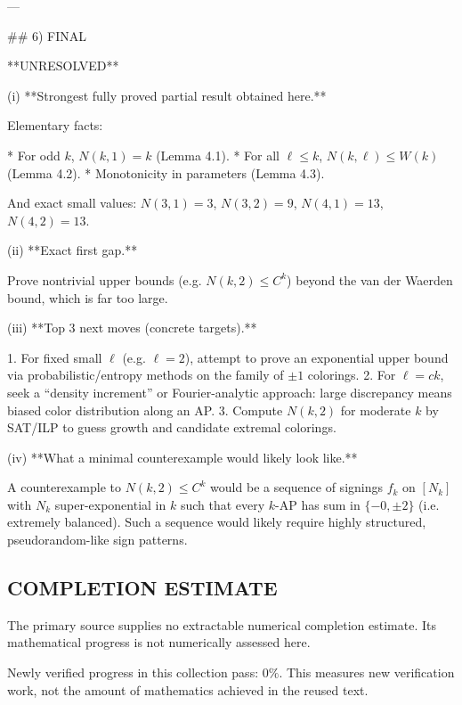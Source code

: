 ---

## 6) FINAL

**UNRESOLVED**

(i) **Strongest fully proved partial result obtained here.**

Elementary facts:

* For odd $k$, $N(k,1)=k$ (Lemma 4.1).
* For all $\ell\le k$, $N(k,\ell)\le W(k)$ (Lemma 4.2).
* Monotonicity in parameters (Lemma 4.3).

And exact small values: $N(3,1)=3$, $N(3,2)=9$, $N(4,1)=13$, $N(4,2)=13$.

(ii) **Exact first gap.**

Prove nontrivial upper bounds (e.g. $N(k,2)\le C^k$) beyond the van der Waerden bound, which is far too large.

(iii) **Top 3 next moves (concrete targets).**

1. For fixed small $\ell$ (e.g. $\ell=2$), attempt to prove an exponential upper bound via probabilistic/entropy methods on the family of $\pm 1$ colorings.
2. For $\ell=ck$, seek a “density increment” or Fourier-analytic approach: large discrepancy means biased color distribution along an AP.
3. Compute $N(k,2)$ for moderate $k$ by SAT/ILP to guess growth and candidate extremal colorings.

(iv) **What a minimal counterexample would likely look like.**

A counterexample to $N(k,2)\le C^k$ would be a sequence of signings $f_k$ on $[N_k]$ with $N_k$ super-exponential in $k$ such that every $k$-AP has sum in $\{-0,\pm 2\}$ (i.e. extremely balanced). Such a sequence would likely require highly structured, pseudorandom-like sign patterns.




\subsection*{COMPLETION ESTIMATE}
The primary source supplies no extractable numerical completion estimate. Its mathematical progress is not numerically assessed here.

Newly verified progress in this collection pass: $0\%$. This measures new verification work, not the amount of mathematics achieved in the reused text.

